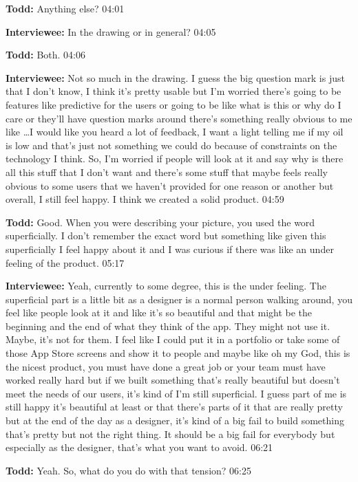 \textbf{Todd:} Anything else?  04:01

\textbf{Interviewee:} In the drawing or in general?  04:05

\textbf{Todd:} Both.  04:06

\textbf{Interviewee:} Not so much in the drawing.  I guess the big question mark is just that I don't know, I think it's pretty usable but I'm worried there's going to be features like predictive for the users or going to be like what is this or why do I care or they'll have question marks around there's something really obvious to me like \ldots I would like you heard a lot of feedback, I want a light telling me if my oil is low and that's just not something we could do because of constraints on the technology I think.  So, I'm worried if people will look at it and say why is there all this stuff that I don't want and there's some stuff that maybe feels really obvious to some users that we haven't provided for one reason or another but overall, I still feel happy.  I think we created a solid product.  04:59

\textbf{Todd:} Good.  When you were describing your  picture, you used the word superficially.  I don't remember the exact word but something like given this superficially I feel happy about it and I was curious if there was like an under feeling of the product.  05:17

\textbf{Interviewee:} Yeah, currently to some degree, this is the under feeling.  The superficial part is a little bit as a designer is a normal person walking around, you feel like people look at it and like it's so beautiful and that might be the beginning and the end of what they think of the app.  They might not use it.  Maybe, it's not for them.  I feel like I could put it in a portfolio or take some of those App Store screens and show it to people and maybe like oh my God, this is the nicest product, you must have done a great job or your team must have worked really hard but if we built something that's really beautiful but doesn't meet the needs of our users, it's kind of I'm still superficial.  I guess part of me is still happy it's beautiful at least or that there's parts of it that are really pretty but at the end of the day as a designer, it's kind of a big fail to build something that's pretty but not the right thing.  It should be a big fail for everybody but especially as the designer, that's what you want to avoid.  06:21

\textbf{Todd:} Yeah.  So, what do you do with that tension?  06:25


